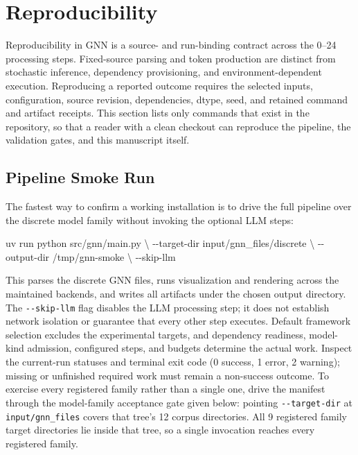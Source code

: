 \documentclass[
  english,
  9pt,
]{extarticle}
\newenvironment{Shaded}{}{}
\newcommand{\AttributeTok}[1]{\textcolor[rgb]{0.49,0.56,0.16}{#1}}
\newcommand{\DataTypeTok}[1]{\textcolor[rgb]{0.56,0.13,0.00}{#1}}
\newcommand{\ExtensionTok}[1]{#1}
\newcommand{\NormalTok}[1]{#1}
\begin{document}
\newpage

\section{Reproducibility}\label{sec:reproducibility}

Reproducibility in GNN is a source- and run-binding contract across the
0--24 processing steps. Fixed-source parsing and token production are
distinct from stochastic inference, dependency provisioning, and
environment-dependent execution. Reproducing a reported outcome requires
the selected inputs, configuration, source revision, dependencies,
dtype, seed, and retained command and artifact receipts. This section
lists only commands that exist in the repository, so that a reader with
a clean checkout can reproduce the pipeline, the validation gates, and
this manuscript itself.

\subsection{Pipeline Smoke Run}\label{pipeline-smoke-run}

The fastest way to confirm a working installation is to drive the full
pipeline over the discrete model family without invoking the optional
LLM steps:

\begin{Shaded}
\begin{Highlighting}[]
\ExtensionTok{uv}\NormalTok{ run python src/gnn/main.py }\DataTypeTok{\textbackslash{}}
  \AttributeTok{{-}{-}target{-}dir}\NormalTok{ input/gnn\_files/discrete }\DataTypeTok{\textbackslash{}}
  \AttributeTok{{-}{-}output{-}dir}\NormalTok{ /tmp/gnn{-}smoke }\DataTypeTok{\textbackslash{}}
  \AttributeTok{{-}{-}skip{-}llm}
\end{Highlighting}
\end{Shaded}

This parses the discrete GNN files, runs visualization and rendering
across the maintained backends, and writes all artifacts under the
chosen output directory. The \texttt{-\/-skip-llm} flag disables the LLM
processing step; it does not establish network isolation or guarantee
that every other step executes. Default framework selection excludes the
experimental targets, and dependency readiness, model-kind admission,
configured steps, and budgets determine the actual work. Inspect the
current-run statuses and terminal exit code (0 success, 1 error, 2
warning); missing or unfinished required work must remain a non-success
outcome. To exercise every registered family rather than a single one,
drive the manifest through the model-family acceptance gate given below:
pointing \texttt{-\/-target-dir} at \texttt{input/gnn\_files} covers
that tree's 12 corpus directories. All 9 registered family target
directories lie inside that tree, so a single invocation reaches every
registered family.
\end{document}

